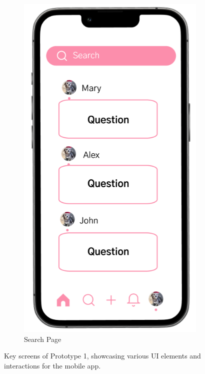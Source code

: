 \begin{figure}[!htbp]
  \hfill
  \begin{subfigure}[b]{0.3\textwidth}
    \includegraphics[width=\textwidth]{Figures/search.png}
    \caption{Search Page}
    \label{fig:search}
  \end{subfigure}
  \caption{Key screens of Prototype 1, showcasing various UI elements and interactions for the mobile app.}
  \label{fig:prototype1_screens_1}
\end{figure}

